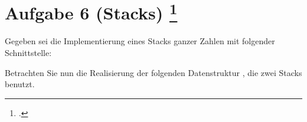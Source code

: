 \documentclass{lehramt-informatik-aufgabe}
\begin{document}
\let\j=\liJavaCode
{}
\section{Aufgabe 6 (Stacks)
\footcite{examen:46115:2019:09}}

Gegeben sei die Implementierung eines Stacks ganzer Zahlen mit folgender
Schnittstelle:


\noindent
Betrachten Sie nun die Realisierung der folgenden Datenstruktur
\j{Mystery}, die zwei Stacks benutzt.

\end{document}

